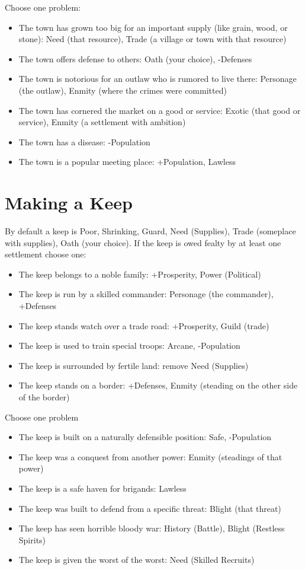 Choose one problem:
\begin{itemize}
\item The town has grown too big for an important supply (like grain, wood, or stone): Need (that resource), Trade (a village or town with that resource)
\item The town offers defense to others: Oath (your choice), -Defenses
\item The town is notorious for an outlaw who is rumored to live there: Personage (the outlaw), Enmity (where the crimes were committed)
\item The town has cornered the market on a good or service: Exotic (that good or service), Enmity (a settlement with ambition)
\item The town has a disease: -Population
\item The town is a popular meeting place: +Population, Lawless

\end{itemize}
\section*{Making a Keep}


By default a keep is Poor, Shrinking, Guard, Need (Supplies), Trade (someplace with supplies), Oath (your choice). If the keep is owed fealty by at least one settlement choose one:
\begin{itemize}
\item The keep belongs to a noble family: +Prosperity, Power (Political)
\item The keep is run by a skilled commander: Personage (the commander), +Defenses
\item The keep stands watch over a trade road: +Prosperity, Guild (trade)
\item The keep is used to train special troops: Arcane, -Population
\item The keep is surrounded by fertile land: remove Need (Supplies)
\item The keep stands on a border: +Defenses, Enmity (steading on the other side of the border)

\end{itemize}


Choose one problem
\begin{itemize}
\item The keep is built on a naturally defensible position: Safe, -Population
\item The keep was a conquest from another power: Enmity (steadings of that power)
\item The keep is a safe haven for brigands: Lawless
\item The keep was built to defend from a specific threat: Blight (that threat)
\item The keep has seen horrible bloody war: History (Battle), Blight (Restless Spirits)
\item The keep is given the worst of the worst: Need (Skilled Recruits)

\end{itemize}

